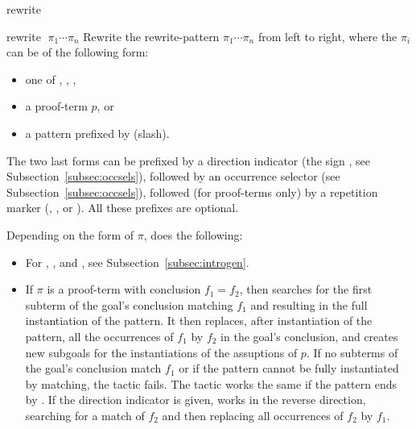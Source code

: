 \begin{tactic}{rewrite}
  \begin{tsyntax}{rewrite $\;\pi_1 \cdots \pi_n$}
  Rewrite the rewrite-pattern $\pi_1 \cdots \pi_n$ from left to right,
  where the $\pi_i$ can be of the following form:
  \begin{itemize}
  \item one of \ec{//}, \ec{/=}, \ec{//=},
  \item a proof-term $p$, or
  \item a pattern prefixed by \ec{/} (slash).
  \end{itemize}
  The two last forms can be prefixed by a direction indicator (the
  sign \ec{-}, see Subsection~\ref{subsec:occsels}), followed by an
  occurrence selector (see Subsection~\ref{subsec:occsels}), followed
  (for proof-terms only) by a repetition marker (\ec{!}, ,
   or ). All these prefixes are optional.

  \smallskip
  Depending on the form of $\pi$,  does the following:
    \begin{itemize}
    \item For \ec{//}, \ec{/=}, and \ec{//=}, see
      Subsection~\ref{subsec:introgen}.

    \item If $\pi$ is a proof-term with conclusion $f_1=f_2$, then
       searches for the first subterm of the goal's
      conclusion matching $f_1$ and resulting in the full
      instantiation of the pattern.  It then replaces, after
      instantiation of the pattern, all the occurrences of $f_1$ by
      $f_2$ in the goal's conclusion, and creates new subgoals for the
      instantiations of the assuptions of $p$.  If no subterms of the
      goal's conclusion match $f_1$ or if the pattern cannot be fully
      instantiated by matching, the tactic fails.  The tactic works
      the same if the pattern ends by . If the
      direction indicator \ec{-} is given,  works in the
      reverse direction, searching for a match of $f_2$ and then
      replacing all occurrences of $f_2$ by $f_1$.


\end{itemize}
\end{tsyntax}
\end{tactic}
